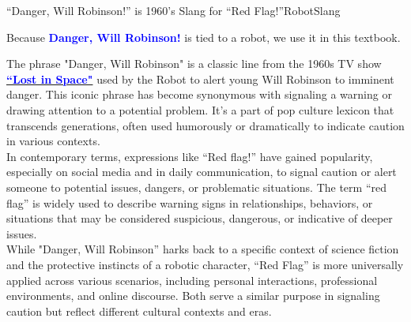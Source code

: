 \Qed

\bigskip

\begin{funColor}{``Danger, Will Robinson!'' is 1960's Slang for ``Red Flag!''}{RobotSlang}

\begin{center}
    {\Large Because \textcolor{blue}{\bf Danger, Will Robinson!} is tied to a robot, we use it in this textbook. }
\end{center}

The phrase "Danger, Will Robinson" is a classic line from the 1960s TV show \href{https://cultural-phenomenons.fandom.com/wiki/Danger,_Will_Robinson}{ \textcolor{blue}{\bf ``Lost in Space"}} used by the Robot to alert young Will Robinson to imminent danger. This iconic phrase has become synonymous with signaling a warning or drawing attention to a potential problem. It's a part of pop culture lexicon that transcends generations, often used humorously or dramatically to indicate caution in various contexts.\\

In contemporary terms, expressions like ``Red flag!'' have gained popularity, especially on social media and in daily communication, to signal caution or alert someone to potential issues, dangers, or problematic situations. The term ``red flag'' is widely used to describe warning signs in relationships, behaviors, or situations that may be considered suspicious, dangerous, or indicative of deeper issues.\\

While "Danger, Will Robinson'' harks back to a specific context of science fiction and the protective instincts of a robotic character, ``Red Flag'' is more universally applied across various scenarios, including personal interactions, professional environments, and online discourse. Both serve a similar purpose in signaling caution but reflect different cultural contexts and eras.\\


\end{funColor}





